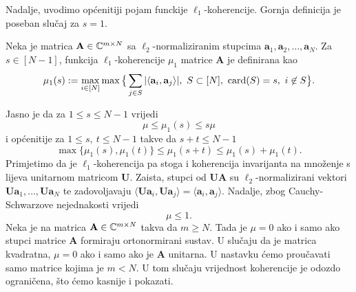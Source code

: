 \documentclass[a4paper,twoside,12pt]{memoir} %
\newcommand{\vect}[1]{\mathbf{#1}}
\renewcommand{\vec}{\vect}
\newcommand{\card}{\text{\normalfont{card}}}
\begin{document}
Nadalje, uvodimo op\'cenitiji pojam funckije $\ell_1$-koherencije. Gornja definicija je poseban slu\v{c}aj za $s = 1$.
\begin{defn}
    Neka je matrica $\vec A \in \C^{m \times N}$ sa $\ell_2$-normaliziranim stupcima  $\vec a_1, \vec a_2, \dots, \vec a_N$. Za $s \in [N-1]$, funkcija $\ell_1$-koherencije $\mu_1$ matrice $\vec A$ je definirana kao
    \begin{equation*}
        \mu_1(s) := \max_{i \in [N]} \max \big\{ \sum_{j \in S} |\langle \vec a_i, \vec a_j \rangle|,\ S \subset [N],\ \card(S) = s,\ i \not \in S   \big\} .
    \end{equation*}
\end{defn}
Jasno je da za $1 \leq s \leq N-1$ vrijedi
\begin{equation}\label{5:2}
    \mu \leq \mu_1(s) \leq s \mu
\end{equation}
i op\'cenitije za $1 \leq s,\ t \leq N-1$ takve da $s+t \leq N-1$
\begin{equation}\label{5:3}
    \max \{\mu_1(s), \mu_1(t)\}  \leq \mu_1(s+t) \leq \mu_1(s) + \mu_1(t).
\end{equation}
Primjetimo da je $\ell_1$-koherencija pa stoga i koherencija invarijanta na mno\v{z}enje s lijeva unitarnom matricom $\vec U$. Zaista, stupci od $\vec{UA}$ su $\ell_2$-normalizirani vektori $\vec{Ua}_1, \dots, \vec{Ua}_N$ te zadovoljavaju $\langle \vec{Ua}_i, \vec{Ua}_j \rangle = \langle \vec a_i , \vec a_j \rangle$. Nadalje, zbog Cauchy-Schwarzove nejednakosti vrijedi
\begin{equation*}
   \mu \leq 1. 
\end{equation*}
Neka je na matrica $\vec A \in \C^{m \times N}$ takva da $m \geq N$. Tada je $\mu = 0$ ako i samo ako stupci matrice $\vec A$ formiraju ortonormirani sustav. U slu\v{c}aju da je matrica kvadratna, $\mu = 0$ ako i samo ako je $\vec A$ unitarna. U nastavku \'cemo prou\v{c}avati samo matrice kojima je $m < N$. U tom slu\v{c}aju vrijednost koherencije je odozdo ograni\v{c}ena, \v{s}to \'cemo kasnije i pokazati. 
\end{document}
